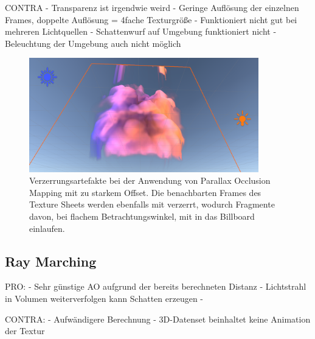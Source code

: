 CONTRA\newline
- Transparenz ist irgendwie weird\newline
- Geringe Auflösung der einzelnen Frames, doppelte Auflösung = 4fache Texturgröße \newline
- Funktioniert nicht gut bei mehreren Lichtquellen\newline
- Schattenwurf auf Umgebung funktioniert nicht\newline
- Beleuchtung der  Umgebung auch nicht möglich\newline

\begin{figure}[h!]
	\includegraphics[width=0.89\textwidth]{Grafiken/Evaluation/Smoke_artefacts.png}
	\centering
	\begin{footnotesize}
		\caption{Verzerrungsartefakte bei der Anwendung von Parallax Occlusion Mapping mit zu starkem Offset. Die benachbarten Frames des Texture Sheets
			werden ebenfalls mit verzerrt, wodurch Fragmente davon, bei flachem Betrachtungswinkel, mit in das Billboard einlaufen.}
		\label{fig:smokeBleeding}
	\end{footnotesize}
\end{figure}



\subsection{Ray Marching}
\label{sec:5.2}

PRO: \newline
- Sehr günstige AO aufgrund der bereits berechneten Distanz\newline
- Lichtstrahl in Volumen weiterverfolgen kann Schatten erzeugen\newline
-

CONTRA: \newline
- Aufwändigere Berechnung\newline
- 3D-Datenset beinhaltet keine Animation der Textur\newline




